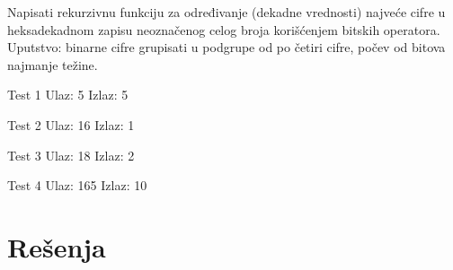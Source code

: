 \begin{Exercise}[label=309]
Napisati rekurzivnu funkciju za određivanje (dekadne vrednosti)
najveće cifre u heksadekadnom zapisu neoznačenog celog broja
korišćenjem bitskih operatora. Uputstvo: binarne cifre
grupisati u podgrupe od po četiri cifre, počev od bitova
najmanje težine.

\begin{minitest}
\begin{test}{Test 1}
Ulaz:  5
Izlaz: 5
\end{test}
\end{minitest}
\begin{minitest}
\begin{test}{Test 2}
Ulaz:  16
Izlaz: 1
\end{test}
\end{minitest}
\begin{minitest}
\begin{test}{Test 3}
Ulaz:  18
Izlaz: 2
\end{test}
\end{minitest}

\begin{minitest}
\begin{test}{Test 4}
Ulaz:  165
Izlaz: 10
\end{test}
\end{minitest}
\end{Exercise}
\begin{Answer}[ref=309]
\end{Answer}


\section{Rešenja}
\shipoutAnswer
